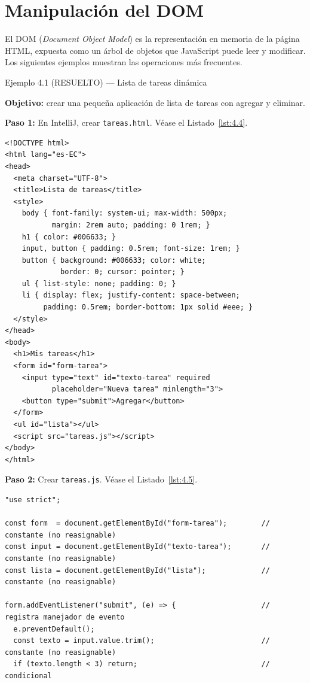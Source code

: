 \documentclass[11pt,a4paper,openany]{book}
\begin{document}
\section{Manipulación del DOM}

El DOM (\emph{Document Object Model}) es la representación
en memoria de la página HTML, expuesta como un árbol de objetos que
JavaScript puede leer y modificar. Los siguientes ejemplos muestran
las operaciones más frecuentes.


\begin{cajaejemplo}{Ejemplo 4.1 (RESUELTO) --- Lista de tareas dinámica}

\textbf{Objetivo:} crear una pequeña aplicación de lista de tareas
con agregar y eliminar.

\textbf{Paso 1:} En IntelliJ, crear \texttt{tareas.html}. V\'ease el Listado~\ref{lst:4.4}.

\begin{lstlisting}[style=html,caption={tareas.html},label=lst:4.4]
<!DOCTYPE html>
<html lang="es-EC">
<head>
  <meta charset="UTF-8">
  <title>Lista de tareas</title>
  <style>
    body { font-family: system-ui; max-width: 500px;
           margin: 2rem auto; padding: 0 1rem; }
    h1 { color: #006633; }
    input, button { padding: 0.5rem; font-size: 1rem; }
    button { background: #006633; color: white;
             border: 0; cursor: pointer; }
    ul { list-style: none; padding: 0; }
    li { display: flex; justify-content: space-between;
         padding: 0.5rem; border-bottom: 1px solid #eee; }
  </style>
</head>
<body>
  <h1>Mis tareas</h1>
  <form id="form-tarea">
    <input type="text" id="texto-tarea" required
           placeholder="Nueva tarea" minlength="3">
    <button type="submit">Agregar</button>
  </form>
  <ul id="lista"></ul>
  <script src="tareas.js"></script>
</body>
</html>
\end{lstlisting}

\textbf{Paso 2:} Crear \texttt{tareas.js}. V\'ease el Listado~\ref{lst:4.5}.

\begin{lstlisting}[style=js,caption={tareas.js},label=lst:4.5]
"use strict";

const form  = document.getElementById("form-tarea");        // constante (no reasignable)
const input = document.getElementById("texto-tarea");       // constante (no reasignable)
const lista = document.getElementById("lista");             // constante (no reasignable)

form.addEventListener("submit", (e) => {                    // registra manejador de evento
  e.preventDefault();
  const texto = input.value.trim();                         // constante (no reasignable)
  if (texto.length < 3) return;                             // condicional


\end{lstlisting}
\end{cajaejemplo}
\end{document}

